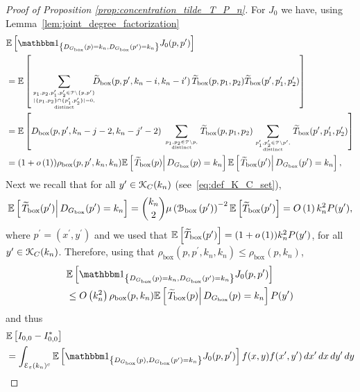 \begin{proof}[Proof of Proposition \ref{prop:concentration_tilde_T_P_n}]
For $J_0$ we have, using Lemma~\ref{lem:joint_degree_factorization}
\begin{align*}
	&\Exp{\ind{\Dbox(p) = k_n, \Dbox(p^\prime) = k_n} J_0(p,p^\prime)}\\
	&= \Exp{\sum_{{p_1, p_2, p_1^\prime, p_2^\prime \in \Pcal \setminus \{p,p^\prime\} 
		\atop |\{p_1, p_2\} \cap \{p_1^\prime, p_2^\prime\}| = 0,} \atop \text{distinct}}
		\hspace{-7pt} \widetilde{D}_{\text{box}}(p,p^\prime, k_n-i,k_n- i^\prime) \,
		\widetilde{T}_{\text{box}}(p,p_1,p_2) \widetilde{T}_{\text{box}}(p^\prime, p_1^\prime, p_2^\prime)}\\
	&= \Exp{D_{\text{box}}(p,p^\prime, k_n-j-2,k_n- j^\prime-2) \, \sum_{p_1,p_2 \in \Pcal \setminus p, \atop \text{distinct}}
		\widetilde{T}_{\text{box}}(p,p_1,p_2)
		\sum_{p_1^\prime,p_2^\prime \in \Pcal \setminus p^\prime, \atop \text{distinct}} 
			\widetilde{T}_{\text{box}}(p^\prime,p_1^\prime,p_2^\prime)}\\
	&= (1+\smallO{1})\rho_{\text{box}}(p,p^\prime,k_n,k_n) \CExp{\widetilde{T}_{\text{box}}(p)}{\Dbox(p) = k_n}
		\CExp{\widetilde{T}_{\text{box}}(p^\prime)}{\Dbox(p^\prime) = k_n},
\end{align*}
Next we recall that for all $y^\prime \in {\mathcal K}_{C}(k_n)$ (see~\eqref{eq:def_K_C_set}), 
\[
	\mathbb{E}\left[\left.\widetilde{T}_{\text{box}}(p^\prime)\right|D_{G_{\mathrm{box}}}(p^\prime) = k_n\right] = \binom{k_n}{2} \mu\left({\mathcal B}_{\text{box}}\left(p^\prime\right)\right)^{-2} \mathbb{E}\left[\widetilde{T}_{\text{box}}(p^\prime)\right] = O\left(1\right)k_n^2 P(y^\prime),
\] 
where $p^\prime = (x^\prime, y^\prime)$ and we used that $\mathbb{E}\left[\widetilde{T}_{\text{box}}(p^\prime)\right] = (1+o\left(1\right)) k_n^2 P(y^\prime)$, for all $y^\prime \in {\mathcal K}_{C}(k_n)$. Therefore, using that $\rho_{\text{box}}(p,p^\prime,k_n,k_n) \le \rho_{\text{box}}(p,k_n)$,
\begin{align*}
	&\Exp{\ind{\Dbox(p) = k_n, \Dbox(p^\prime) = k_n} J_0(p,p^\prime)}\\
	&\le \bigO{k_n^2} \rho_{\text{box}}(p,k_n) \CExp{\widetilde{T}_{\text{box}}(p)}{\Dbox(p) = k_n} P(y^\prime)
\end{align*}
and thus
\begin{align*}
	&\Exp{I_{0,0} - I_{0,0}^\ast}\\
	&= \int_{\mathcal{E}_\varepsilon(k_n)^c}
		\Exp{\ind{\Dbox(p), \Dbox(p^\prime) = k_n} J_0(p,p^\prime)} f(x,y) f(x^\prime,y^\prime) \, dx^\prime \, dx \, dy^\prime \, dy\\

\end{align*}
\end{proof}
